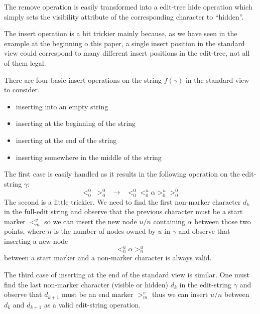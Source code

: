 \documentclass{amsart}
\begin{document}
The remove operation is easily transformed into a edit-tree hide operation which 
simply sets the visibility attribute of the corresponding character to ``hidden''.

The insert operation is a bit trickier mainly because, as we have
seen in the example at the beginning o this paper,
a single insert position in
the standard view could correspond to many different insert positions in the 
edit-tree, not all of them legal.


There are four basic insert operations on the string $f(\gamma)$ in the standard view to consider.
\begin{itemize}
\item inserting into an empty string
\item inserting at the beginning of the string
\item inserting at the end of the string
\item inserting somewhere in the middle of the string 
\end{itemize}
The first case is easily handled as it results in the following operation on the 
edit-string $\gamma$:
\[
<^0_0\;>^0_0 \;\; \rightarrow \;\;<^0_0 <^u_0 \alpha >^u_0 >^0_0
\]
The second is a little trickier. We need to find the first non-marker character $d_k$
in the full-edit string and observe that the previous character must be a start
marker $<^v_m$ so we can insert the new node $u/n$ containing $\alpha$ between those
two points, where $n$ is the number of nodes owned by $u$ in $\gamma$ and observe
that inserting a new node 
\[
<^u_n \alpha >^u_n
\]
between a start marker and a non-marker character is always valid.

The third case of inserting at the end of the standard view is similar. One
must find the last non-marker character (visible or hidden) $d_k$ in the
edit-string $\gamma$ and observe that $d_{k+1}$ must be an end marker
$>^v_m$ thus we can insert $u/n$ between $d_k$ and $d_{k+1}$ as a valid
edit-string operation.
\end{document}
